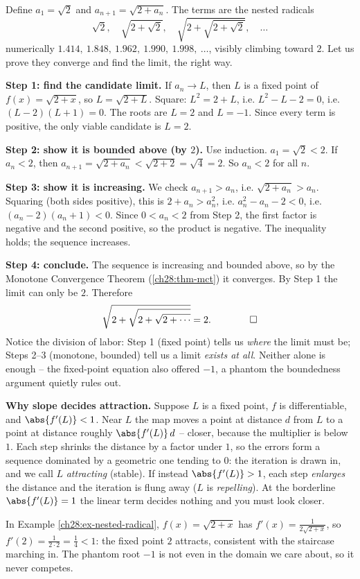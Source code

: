 \begin{example}[A recursion that converges: $a_{n+1} = \sqrt{2 + a_n}$]
\label{ch28:ex-nested-radical}
Define $a_1 = \sqrt2$ and $a_{n+1} = \sqrt{2 + a_n}$. The terms are the nested
radicals
\[
  \sqrt2,\quad \sqrt{2 + \sqrt2},\quad \sqrt{2 + \sqrt{2 + \sqrt2}},\quad \dots
\]
numerically $1.414,\ 1.848,\ 1.962,\ 1.990,\ 1.998,\ \dots$, visibly climbing
toward $2$. Let us prove they converge and find the limit, the right way.

\textbf{Step 1: find the candidate limit.} If $a_n \to L$, then $L$ is a fixed
point of $f(x) = \sqrt{2 + x}$, so $L = \sqrt{2 + L}$. Square: $L^2 = 2 + L$, i.e.
$L^2 - L - 2 = 0$, i.e. $(L-2)(L+1) = 0$. The roots are $L = 2$ and $L = -1$.
Since every term is positive, the only viable candidate is $L = 2$.

\textbf{Step 2: show it is bounded above (by $2$).} Use induction. $a_1 =
\sqrt2 < 2$. If $a_n < 2$, then $a_{n+1} = \sqrt{2 + a_n} < \sqrt{2 + 2} =
\sqrt4 = 2$. So $a_n < 2$ for all $n$.

\textbf{Step 3: show it is increasing.} We check $a_{n+1} > a_n$, i.e. $\sqrt{2 +
a_n} > a_n$. Squaring (both sides positive), this is $2 + a_n > a_n^2$, i.e.
$a_n^2 - a_n - 2 < 0$, i.e. $(a_n - 2)(a_n + 1) < 0$. Since $0 < a_n < 2$ from
Step 2, the first factor is negative and the second positive, so the product is
negative. The inequality holds; the sequence increases.

\textbf{Step 4: conclude.} The sequence is increasing and bounded above, so by
the Monotone Convergence Theorem (\ref{ch28:thm-mct}) it converges. By Step 1 the
limit can only be $2$. Therefore
\[
  \sqrt{2 + \sqrt{2 + \sqrt{2 + \cdots}}} = 2. \qquad\qed
\]
Notice the division of labor: Step 1 (fixed point) tells us \emph{where} the
limit must be; Steps 2--3 (monotone, bounded) tell us a limit \emph{exists at
all}. Neither alone is enough -- the fixed-point equation also offered $-1$, a
phantom the boundedness argument quietly rules out.
\end{example}

\begin{whybox}
\textbf{Why slope decides attraction.} Suppose $L$ is a fixed point, $f$ is
differentiable, and $\abs{f'(L)} < 1$. Near $L$ the map moves a point at distance
$d$ from $L$ to a point at distance roughly $\abs{f'(L)}\,d$ -- closer, because
the multiplier is below $1$. Each step shrinks the distance by a factor under
$1$, so the errors form a sequence dominated by a geometric one tending to $0$:
the iteration is drawn in, and we call $L$ \emph{attracting} (stable). If instead
$\abs{f'(L)} > 1$, each step \emph{enlarges} the distance and the iteration is
flung away ($L$ is \emph{repelling}). At the borderline $\abs{f'(L)} = 1$ the
linear term decides nothing and you must look closer.

In Example \ref{ch28:ex-nested-radical}, $f(x) = \sqrt{2+x}$ has $f'(x) =
\tfrac{1}{2\sqrt{2+x}}$, so $f'(2) = \tfrac{1}{2\cdot 2} = \tfrac14 < 1$: the
fixed point $2$ attracts, consistent with the staircase marching in. The phantom
root $-1$ is not even in the domain we care about, so it never competes.
\end{whybox}


